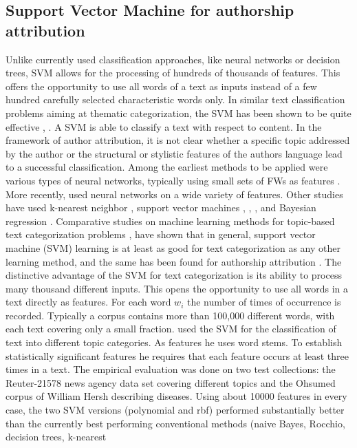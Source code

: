 \subsection{Support Vector Machine for authorship attribution}
Unlike currently used
classification approaches, like neural networks or decision trees, SVM allows for the processing of hundreds of thousands of features. This offers the opportunity to use all words of a text as inputs instead of a few hundred carefully selected characteristic words only. In similar text classification problems aiming at thematic categorization, the SVM has been shown to be quite effective \cite{joachims1998making}, \cite{dumais1998inductive}.
A SVM is able to classify a text with respect to content. In the framework of author attribution, it is not clear whether a specific topic addressed by the author or the structural or stylistic features of the authors language lead to a successful classification.
Among the earliest methods to be applied were various types of neural networks, typically using small sets of FWs as features \cite{holmes1995forensic}.
More recently, \citeauthor{hirst2007bigrams} used neural networks on a wide variety of features. Other studies have used k-nearest neighbor \cite{zhao2005effective}, support vector machines \cite{diederich2003authorship}, \cite{koppel2005determining}, \cite{zheng2006framework}, and Bayesian regression \cite{madigan2005author}.
Comparative studies on machine learning methods for topic-based text categorization problems \citeauthor{dumais1998inductive}, \citeauthor{joachims1998making} have shown that in general, support vector machine (SVM) learning is at least as good for text categorization as any other
learning method, and the same has been found for authorship attribution \cite{zheng2006framework}.
The distinctive advantage of the SVM for text categorization is its ability to process many thousand different inputs. This opens the opportunity to use all words
in a text directly as features. For each word $w_i$ the number of times of occurrence is recorded. Typically a corpus contains more than 100,000 different words,
with each text covering only a small fraction.
\citeauthor{joachims1998making} \cite{joachims1998making} used the SVM for the classification of text into different topic categories. As features he uses word stems. To establish statistically significant features he requires that each feature occurs at least three times in a text. The empirical evaluation was done
on two test collections: the Reuter-21578 news agency
data set covering different topics and the Ohsumed corpus of William Hersh describing diseases. Using about 10000 features in every case, the two SVM versions (polynomial and rbf) performed substantially better than the currently best performing conventional methods (naive Bayes, Rocchio, decision trees, k-nearest
